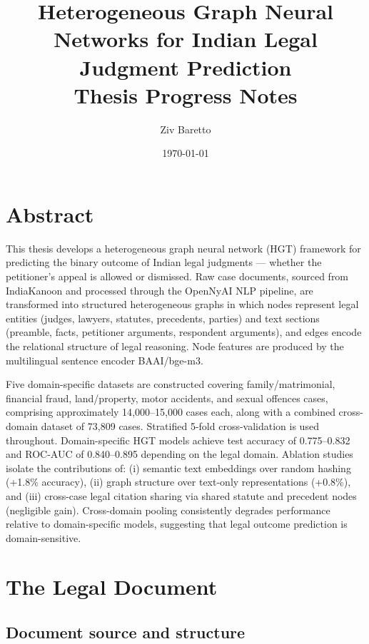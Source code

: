 \documentclass[12pt,a4paper]{article}
\title{\textbf{Heterogeneous Graph Neural Networks for Indian Legal Judgment Prediction}\\
\large Thesis Progress Notes}
\author{Ziv Baretto}
\date{\today}
\begin{document}
\maketitle

\section*{Abstract}

This thesis develops a heterogeneous graph neural network (HGT) framework for predicting the binary outcome of Indian legal judgments — whether the petitioner's appeal is allowed or dismissed. Raw case documents, sourced from IndiaKanoon and processed through the OpenNyAI NLP pipeline, are transformed into structured heterogeneous graphs in which nodes represent legal entities (judges, lawyers, statutes, precedents, parties) and text sections (preamble, facts, petitioner arguments, respondent arguments), and edges encode the relational structure of legal reasoning. Node features are produced by the multilingual sentence encoder BAAI/bge-m3.

Five domain-specific datasets are constructed covering family/matrimonial, financial fraud, land/property, motor accidents, and sexual offences cases, comprising approximately 14{,}000--15{,}000 cases each, along with a combined cross-domain dataset of 73{,}809 cases. Stratified 5-fold cross-validation is used throughout. Domain-specific HGT models achieve test accuracy of 0.775--0.832 and ROC-AUC of 0.840--0.895 depending on the legal domain. Ablation studies isolate the contributions of: (i) semantic text embeddings over random hashing (+1.8\% accuracy), (ii) graph structure over text-only representations (+0.8\%), and (iii) cross-case legal citation sharing via shared statute and precedent nodes (negligible gain). Cross-domain pooling consistently degrades performance relative to domain-specific models, suggesting that legal outcome prediction is domain-sensitive.


\section{The Legal Document}

\subsection{Document source and structure}
\end{document}
